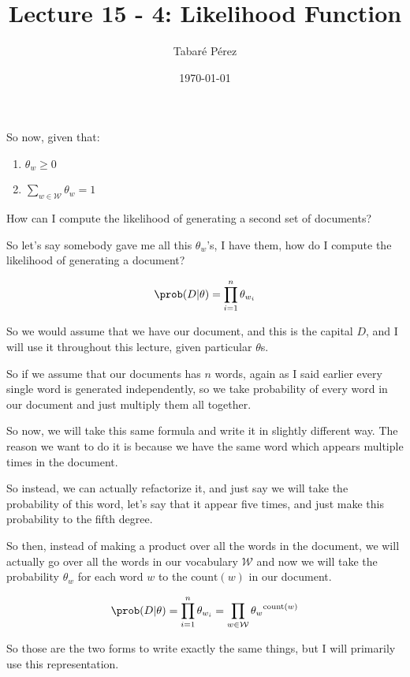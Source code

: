 \documentclass[a4paper, 12pt]{article}
\author{Tabaré Pérez}
\date{\today}
\title{Lecture 15 - 4: Likelihood Function}
\begin{document}
\maketitle
So now, given that:

\begin{enumerate}
\item \(\theta_w \geq 0\)
\item \(\sum_{w \in \mathcal{W}} \theta_w = 1\)
\end{enumerate}

How can I compute the likelihood of generating a second set of documents?

So let's say somebody gave me all this \(\theta_w\)'s, I have them, how do I
compute the likelihood of generating a document?

\begin{equation}
\prob(D|\theta) = \prod_{i=1}^{n}\theta_{w_i}
\end{equation}

So we would assume that we have our document, and this is the capital \(D\), and I will use it throughout this
lecture, given particular \(\theta\)s.

So if we assume that our documents has \(n\) words, again as I said earlier
every single word is generated independently, so we take probability of every
word in our document and just multiply them all together.

So now, we will take this same formula and write it in slightly different way.
The reason we want to do it is because we have the same word which appears
multiple times in the document.

So instead, we can actually refactorize it, and just say we will take the
probability of this word, let's say that it appear five times, and just make
this probability to the fifth degree.

So then, instead of making a product over all the words in the document, we will
actually go over all the words in our vocabulary \(\mathcal{W}\) and now we will
take the probability \(\theta_w\) for each word \(w\) to the \(\text{count}(w)\)
in our document.

\begin{equation}
\prob(D|\theta) = \prod_{i=1}^{n}\theta_{w_i} = \prod_{w \in \mathcal{W}} {\theta_{w}}^{\text{count}(w)}
\end{equation}

So those are the two forms to write exactly the same things,
but I will primarily use this representation.
\end{document}
